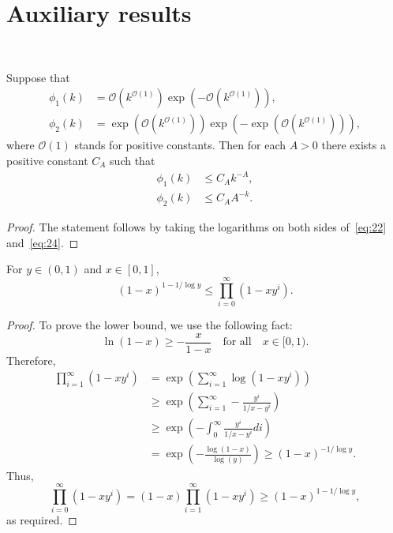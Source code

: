 \section{Auxiliary results}

\ 
\begin{lem}\label{Terry O} 
  Suppose that
  \begin{align*}
    \phi_{1}(k)&=\mathcal{O}(k^{\mathcal{O}(1)})\exp(-\mathcal{O}(k^{\mathcal{O}(1)})),
  \\\phi_{2}(k)&=\exp(\mathcal{O}(k^{\mathcal{O}(1)}))\exp(-\exp(\mathcal{O}(k^{\mathcal{O}(1)}))),
  \end{align*}
  where $\mathcal{O}(1)$ stands for positive constants. Then for each $A>0$ there exists a positive constant $C_{A}$ such
  that
  \begin{align}
    \phi_{1}(k)&\leq C_{A} k^{-A}, \label{eq:22}
  \\\phi_{2}(k)&\leq C_{A} A^{-k}. \label{eq:24}
  \end{align}
\end{lem}

\begin{proof}
  The statement follows by taking the logarithms on both sides
  of~\eqref{eq:22} and~\eqref{eq:24}.
\end{proof}

\begin{lem} \label{fact:Q-Pochhammer_Lower_Bound}
  For $y\in(0,1)$ and $x\in[0,1]$,
\begin{equation} \label{eq:11}
(1-x)^{1-1/\log y}\leq\prod_{i=0}^{\infty}(1-xy^{i}).
\end{equation}
\end{lem}
\begin{proof}
  To prove the lower bound, we use the following fact:
  \begin{equation*} 
    \ln(1-x)  \geq-\frac{x}{1-x}
    \quad
    \mbox{for all} \quad x\in[0,1).
  \end{equation*}
  Therefore,
\begin{align*}
\prod_{i=1}^{\infty}(1-xy^{i}) & =\exp\left(\sum_{i=1}^{\infty}\log\left(1-xy^{i}\right)\right)\\
 & \geq\exp\left(\sum_{i=1}^{\infty}-\frac{y^{i}}{1/x-y^{i}}\right)\\
 & \geq\exp\left(-\int_{0}^{\infty}\frac{y^{i}}{1/x-y^{i}}di\right)\\
 & =\exp\left(-\frac{\log(1-x)}{\log(y)}\right)
  \geq(1-x)^{-1/\log y}.
\end{align*}
Thus,
\[
\prod_{i=0}^{\infty}(1-xy^{i})  =(1-x)\prod_{i=1}^{\infty}(1-xy^{i})
\ge(1-x)^{1-1/\log y},
\]
as required.
\end{proof}

